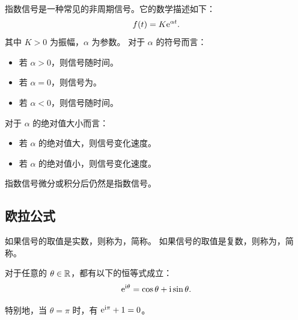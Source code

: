 \begin{example}[指数信号]
    指数信号是一种常见的非周期信号。它的数学描述如下：
    \begin{align*}
        f(t) = K\mathrm{e}^{\alpha t}.
    \end{align*}
    其中 $K > 0$ 为振幅，$\alpha$ 为参数。
    对于 $\alpha$ 的符号而言：
    \begin{itemize}
        \item 若 $\alpha > 0$，则信号随时间。
        \item 若 $\alpha = 0$，则信号为。
        \item 若 $\alpha < 0$，则信号随时间。
    \end{itemize}
    对于 $\alpha$ 的绝对值大小而言：
    \begin{itemize}
        \item 若 $\alpha$ 的绝对值大，则信号变化速度。
        \item 若 $\alpha$ 的绝对值小，则信号变化速度。
    \end{itemize}
\end{example}

\begin{remark}
    指数信号微分或积分后仍然是指数信号。
\end{remark}

\subsection{欧拉公式}

\begin{definition}[实值信号与复值信号]
    如果信号的取值是实数，则称为，简称。
    如果信号的取值是复数，则称为，简称。
\end{definition}

\begin{theorem}[欧拉公式]
    对于任意的 $\theta \in \mathbb{R}$，都有以下的恒等式成立：
    \begin{align*}
        \mathrm{e}^{\mathrm{i} \theta} = \cos \theta + \mathrm{i} \sin\theta.
    \end{align*}

    特别地，当 $\theta = \pi$ 时，有 $\mathrm{e}^{\mathrm{i}\pi} + 1 = 0$。
\end{theorem}

